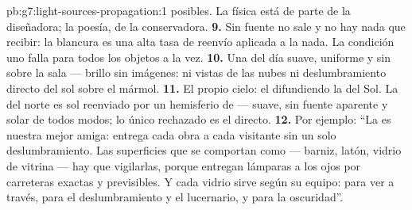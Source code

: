\begin{solution}{pb:g7:light-sources-propagation:1}
posibles. La física está de parte de la diseñadora; la poesía, de la
conservadora.
\textbf{9.} Sin fuente no sale  y no hay nada que recibir: la
blancura es una alta tasa de reenvío aplicada a la nada. La condición
uno falla para todos los objetos a la vez.
\textbf{10.} Una  del día suave, uniforme y sin  sobre la
sala --- brillo sin imágenes: ni vistas de las nubes ni
deslumbramiento directo del sol sobre el mármol.
\textbf{11.} El propio cielo: el  difundiendo la  del Sol. La
 del norte es sol reenviado por un hemisferio de  ---
suave, sin fuente aparente y solar de todos modos; lo único rechazado
es el  directo.
\textbf{12.} Por ejemplo: ``La  es nuestra mejor amiga:
entrega cada obra a cada visitante sin un solo deslumbramiento. Las
superficies que se comportan como  --- barniz, latón, vidrio de
vitrina --- hay que vigilarlas, porque entregan lámparas a los ojos
por carreteras exactas y previsibles. Y cada vidrio sirve según su
equipo:  para ver a través,  para el
deslumbramiento y el lucernario, y  para la oscuridad''.
\end{solution}
